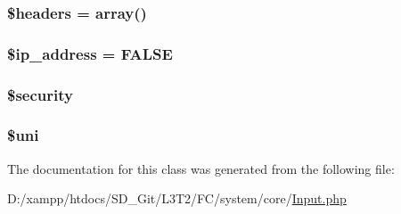 \subsubsection[{\$headers}]{\setlength{\rightskip}{0pt plus 5cm}\$headers = array()\hspace{0.3cm}{\ttfamily [protected]}}\label{class_c_i___input_a52500036ee807241b8b4b7e2367c49ef}
\hypertarget{class_c_i___input_a614e10d1ab6dcf06fa7fef37af7b7eee}{}
\subsubsection[{\$ip\+\_\+address}]{\setlength{\rightskip}{0pt plus 5cm}\${\bf ip\+\_\+address} = F\+A\+L\+S\+E\hspace{0.3cm}{\ttfamily [protected]}}\label{class_c_i___input_a614e10d1ab6dcf06fa7fef37af7b7eee}
\hypertarget{class_c_i___input_a7ef3408af92597c92305e22f79e67d61}{}
\subsubsection[{\$security}]{\setlength{\rightskip}{0pt plus 5cm}\$security\hspace{0.3cm}{\ttfamily [protected]}}\label{class_c_i___input_a7ef3408af92597c92305e22f79e67d61}
\hypertarget{class_c_i___input_a6ed6e0f7f970550e288f83845eec6393}{}
\subsubsection[{\$uni}]{\setlength{\rightskip}{0pt plus 5cm}\$uni\hspace{0.3cm}{\ttfamily [protected]}}\label{class_c_i___input_a6ed6e0f7f970550e288f83845eec6393}


The documentation for this class was generated from the following file\+:\begin{DoxyCompactItemize}
\item 
D\+:/xampp/htdocs/\+S\+D\+\_\+\+Git/\+L3\+T2/\+F\+C/system/core/\hyperlink{system_2core_2_input_8php}{Input.\+php}\end{DoxyCompactItemize}
